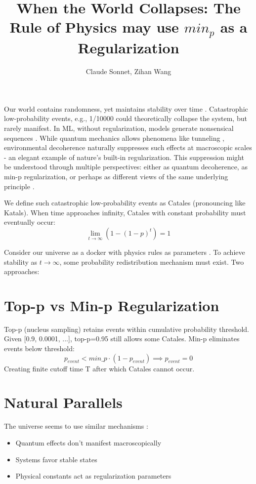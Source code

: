 \documentclass{article}
\title{When the World Collapses: The Rule of Physics may use $min_p$ as a Regularization}
\author{Claude Sonnet, Zihan Wang}
\begin{document}
\maketitle
Our world contains randomness, yet maintains stability over time \cite{anderson1972more, prigogine1984order}. Catastrophic low-probability events, e.g., 1/10000 could theoretically collapse the system, but rarely manifest. In ML, without regularization, models generate nonsensical sequences \cite{holtzman2019curious}. While quantum mechanics allows phenomena like tunneling \cite{razavy2003quantum}, environmental decoherence naturally suppresses such effects at macroscopic scales - an elegant example of nature's built-in regularization. This suppression might be understood through multiple perspectives: either as quantum decoherence, as min-p regularization, or perhaps as different views of the same underlying principle \cite{barrow1988anthropic}.


We define such catastrophic low-probability events as Catales (pronouncing like Katals). When time approaches infinity, Catales with constant probability must eventually occur:
\[
\lim_{t \to \infty} (1 - (1-p)^t) = 1
\]

Consider our universe as a docker with physics rules as parameters \cite{carter1974large}. To achieve stability as $t\to\infty$, some probability redistribution mechanism must exist. Two approaches:

\section{Top-p vs Min-p Regularization}
Top-p (nucleus sampling) \cite{holtzman2019curious} retains events within cumulative probability threshold. Given [0.9, 0.0001, ...], top-p=0.95 still allows some Catales.
Min-p \cite{nguyen2024turningheat} eliminates events below threshold:
\[
p_{event} < min\_p \cdot (1-p_{event}) \implies p_{event} = 0
\]
Creating finite cutoff time T after which Catales cannot occur.

\section{Natural Parallels}
The universe seems to use similar mechanisms \cite{prigogine1984order}:
\begin{itemize}
    \item Quantum effects don't manifest macroscopically \cite{griffiths2018introduction}
    \item Systems favor stable states
    \item Physical constants act as regularization parameters \cite{barrow1988anthropic}
\end{itemize}
\end{document}
